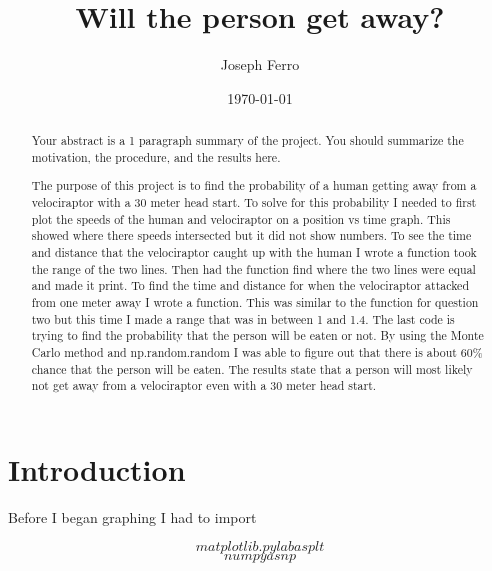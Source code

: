 \documentclass[twocolumn]{revtex4}
\begin{document}
\title{
Will the person get away?
}

\author{Joseph Ferro }


\date{\today}

\begin{abstract}
    Your abstract is a 1 paragraph summary of the project.
    You should summarize the motivation, the procedure, and the 
    results here.
    
    The purpose of this project is to find the probability of a human getting away from a velociraptor with a 30 meter head start. To solve for this probability I needed to first plot the speeds of the human and velociraptor on a position vs time graph. This showed where there speeds intersected but it did not show numbers. To see the time and distance that the velociraptor caught up with the human I wrote a function took the range of the two lines. Then had the function find where the two lines were equal and made it print. To find the time and distance for when the velociraptor attacked from one meter away I wrote a function. This was similar to the function for question two but this time I made a range that was in between 1 and 1.4. The last code is trying to find the probability that the person will be eaten or not. By using the Monte Carlo method and np.random.random I was able to figure out that there is about 60\% chance that the person will be eaten. The results state that a person will most likely not get away from a velociraptor even with a 30 meter head start. 
    
\end{abstract}

\maketitle

\section{Introduction}

Before I began graphing I had to import

$$matplotlib.pylab as plt$$
$$ numpy as np$$
\end{document}
